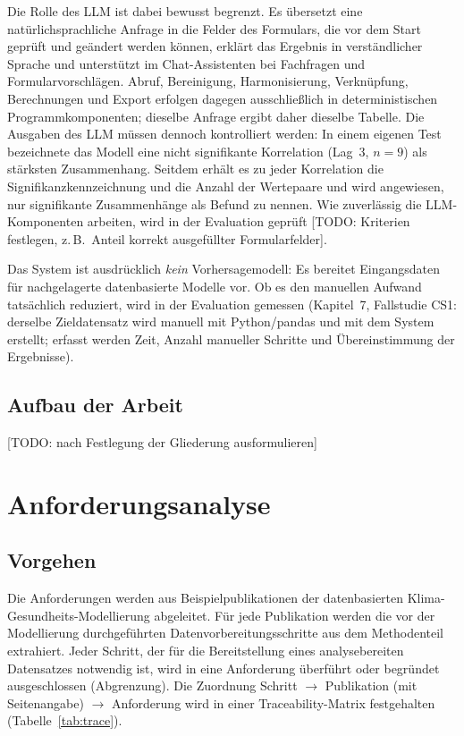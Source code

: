 \documentclass[11pt,a4paper]{article}
\newcommand{\todo}[1]{\textcolor{red!70!black}{[TODO: #1]}}
\begin{document}
Die Rolle des LLM ist dabei bewusst begrenzt. Es übersetzt eine
natürlichsprachliche Anfrage in die Felder des Formulars, die vor dem Start
geprüft und geändert werden können, erklärt das Ergebnis in verständlicher
Sprache und unterstützt im Chat-Assistenten bei Fachfragen und Formularvorschlägen.
Abruf, Bereinigung, Harmonisierung, Verknüpfung, Berechnungen und Export
erfolgen dagegen ausschließlich in deterministischen Programmkomponenten;
dieselbe Anfrage ergibt daher dieselbe Tabelle. Die Ausgaben des LLM müssen
dennoch kontrolliert werden: In einem eigenen Test bezeichnete das Modell eine
nicht signifikante Korrelation (Lag~3, $n = 9$) als stärksten Zusammenhang.
Seitdem erhält es zu jeder Korrelation die Signifikanzkennzeichnung und die
Anzahl der Wertepaare und wird angewiesen, nur signifikante Zusammenhänge als
Befund zu nennen. Wie zuverlässig die LLM-Komponenten arbeiten, wird in der Evaluation
geprüft \todo{Kriterien festlegen, z.\,B.\ Anteil korrekt ausgefüllter Formularfelder}.

Das System ist ausdrücklich \emph{kein} Vorhersagemodell: Es bereitet
Eingangsdaten für nachgelagerte datenbasierte Modelle vor. Ob es den manuellen
Aufwand tatsächlich reduziert, wird in der Evaluation gemessen
(Kapitel~7, Fallstudie CS1: derselbe Zieldatensatz wird manuell mit
Python/pandas und mit dem System erstellt; erfasst werden Zeit, Anzahl manueller
Schritte und Übereinstimmung der Ergebnisse).

\subsection{Aufbau der Arbeit}
\todo{nach Festlegung der Gliederung ausformulieren}

\setcounter{section}{2}
\section{Anforderungsanalyse}

\subsection{Vorgehen}

Die Anforderungen werden aus Beispielpublikationen der datenbasierten
Klima-Gesundheits-Modellierung abgeleitet. Für jede Publikation werden die vor
der Modellierung durchgeführten Datenvorbereitungsschritte aus dem Methodenteil
extrahiert. Jeder Schritt, der für die Bereitstellung eines analysebereiten
Datensatzes notwendig ist, wird in eine Anforderung überführt oder begründet
ausgeschlossen (Abgrenzung). Die Zuordnung Schritt $\rightarrow$ Publikation
(mit Seitenangabe) $\rightarrow$ Anforderung wird in einer Traceability-Matrix
festgehalten (Tabelle~\ref{tab:trace}).
\end{document}
